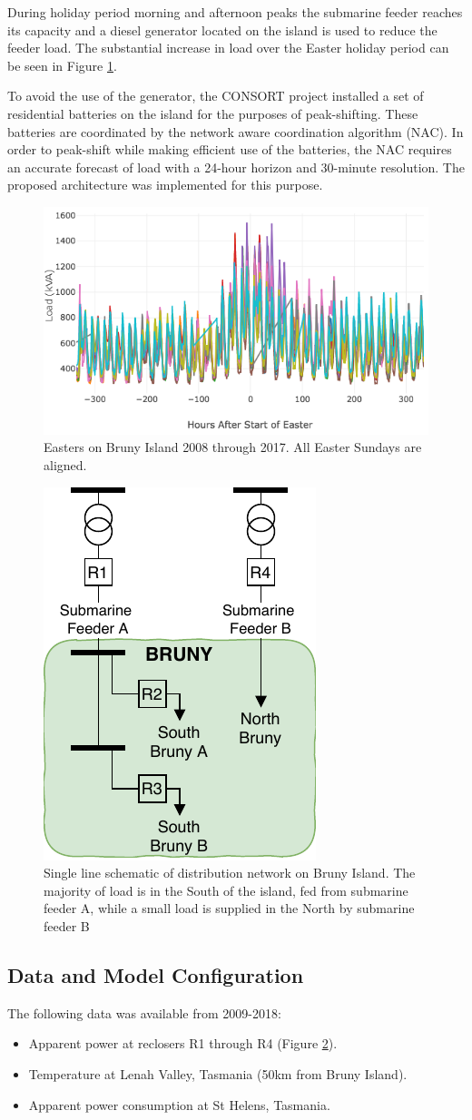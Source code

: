 \documentclass[conference]{IEEEtran}
\begin{document}
During holiday period morning and afternoon peaks the submarine feeder reaches its capacity and a diesel generator located on the island is used to reduce the feeder load.
The substantial increase in load over the Easter holiday period can be seen in Figure \ref{fig:bruny_easter}.

To avoid the use of the generator, the CONSORT project installed a set of residential batteries on the island for the purposes of peak-shifting.
These batteries are coordinated by the network aware coordination algorithm (NAC).
In order to peak-shift while making efficient use of the batteries, the NAC requires an accurate forecast of load with a 24-hour horizon and 30-minute resolution.
The proposed architecture was implemented for this purpose.

\begin{figure}[htbp]
	\centerline{\includegraphics[width=.35\textwidth]{images/easter_bruny.png}}
	\caption{Easters on Bruny Island 2008 through 2017. All Easter Sundays are aligned.}
	\label{fig:bruny_easter}
\end{figure}

\begin{figure}[htbp]
	\centerline{\includegraphics[width=.2\textwidth]{images/bruny_single_line.pdf}}
	\caption{Single line schematic of distribution network on Bruny Island.
			 The majority of load is in the South of the island, fed from submarine feeder A, while a small load is supplied in the North by submarine feeder B}
	\label{fig:bruny_network}
\end{figure}

\subsection{Data and  Model Configuration}
The following data was available from 2009-2018:
\begin{itemize}
	\item Apparent power at reclosers R1 through R4 (Figure \ref{fig:bruny_network}).
	\item Temperature at Lenah Valley, Tasmania (50km from Bruny Island). 
	\item Apparent power consumption at St Helens, Tasmania.
\end{itemize}
\end{document}
